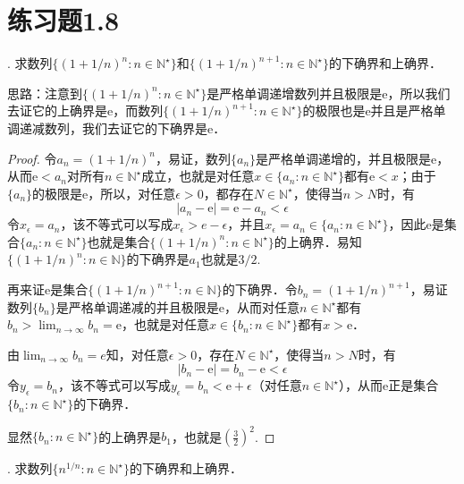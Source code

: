 \documentclass{ctexart}
\theoremstyle{definition}
\theoremstyle{definition}
\theoremstyle{plain}
\theoremstyle{plain}
\theoremstyle{plain}
\theoremstyle{definition}
\begin{document}
\section*{练习题1.8}
. 求数列$\{ (1+1/n)^n : n \in \mathbb{N}^\star \}$和$\{(1+1/n)^{n+1}:n\in\mathbb{N}^\star\}$的下确界和上确界．

\noindent 思路：注意到$\{ (1+1/n)^n : n \in \mathbb{N}^\star \}$是严格单调递增数列并且极限是$\mathrm{e}$，所以我们去证它的上确界是$\mathrm{e}$，而数列$\{(1+1/n)^{n+1}:n\in\mathbb{N}^\star\}$的极限也是$\mathrm{e}$并且是严格单调递减数列，我们去证它的下确界是$\mathrm{e}$．
\begin{proof}
令$a_n = (1+1/n)^n$，易证，数列$\{ a_n \}$是严格单调递增的，并且极限是$\mathrm{e}$，从而$\mathrm{e} < a_n$对所有$n \in \mathbb{N}^\star$成立，也就是对任意$x \in \{a_n:n\in\mathbb{N}^\star\}$都有$\mathrm{e}<x$；由于$\{a_n\}$的极限是$\mathrm{e}$，所以，对任意$\epsilon >0$，都存在$N \in \mathbb{N}^\star$，使得当$n>N$时，有
\begin{equation}
    |a_n - \mathrm{e}| = \mathrm{e}-a_n < \epsilon
\end{equation}
令$x_\epsilon = a_n$，该不等式可以写成$x_\epsilon > e - \epsilon$，并且$x_\epsilon = a_n \in \{a_n : n \in \mathbb{N}^\star \}$，因此$\mathrm{e}$是集合$\{ a_n : n \in \mathbb{N}^\star \}$也就是集合$\{ (1+1/n)^n : n \in \mathbb{N}^\star \}$的上确界．易知$\{(1+1/n)^n:n\in\mathbb{N}\}$的下确界是$a_1$也就是$3/2$.

\noindent 再来证$\mathrm{e}$是集合$\{(1+1/n)^{n+1}:n\in\mathbb{N}\}$的下确界．令$b_n=(1+1/n)^{n+1}$，易证数列$\{b_n\}$是严格单调递减的并且极限是$\mathrm{e}$，从而对任意$n \in \mathbb{N}^\star$都有$b_n > \displaystyle\lim_{n\to\infty} b_n = \mathrm{e}$，也就是对任意$ x \in \{ b_n : n \in \mathbb{N}^\star \}$都有$x > \mathrm{e}$．

\noindent 由$\displaystyle\lim_{n\to\infty}b_n = e$知，对任意$\epsilon > 0$，存在$N \in \mathbb{N}^\star$，使得当$n > N$时，有
\begin{equation}
    |b_n - \mathrm{e}| = b_n - \mathrm{e} < \epsilon 
\end{equation}
令$y_\epsilon = b_n$，该不等式可以写成$y_\epsilon = b_n < \mathrm{e} + \epsilon$（对任意$n\in\mathbb{N}^\star$），从而$\mathrm{e}$正是集合$\{b_n:n\in\mathbb{N}^\star\}$的下确界．

\noindent 显然$\{b_n:n\in\mathbb{N}^\star\}$的上确界是$b_1$，也就是$\displaystyle \left(\frac{3}{2}\right)^2$.
\end{proof}

. 求数列$\{n^{1/n}:n\in\mathbb{N}^\star\}$的下确界和上确界．
\end{document}
